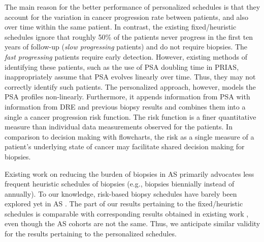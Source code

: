 \documentclass[Afour,sagev,times]{sagej}
\begin{document}
The main reason for the better performance of personalized schedules is that they account for the variation in cancer progression rate between patients, and also over time within the same patient. In contrast, the existing fixed/heuristic schedules ignore that roughly 50\% of the patients never progress in the first ten years of follow-up (\textit{slow progressing} patients) and do not require biopsies. The \textit{fast progressing} patients require early detection. However, existing methods of identifying these patients, such as the use of PSA doubling time in PRIAS, inappropriately assume that PSA evolves linearly over time. Thus, they may not correctly identify such patients. The personalized approach, however, models the PSA profiles non-linearly. Furthermore, it appends information from PSA with information from DRE and previous biopsy results and combines them into a single a cancer progression risk function. The risk function is a finer quantitative measure than individual data measurements observed for the patients. In comparison to decision making with flowcharts, the risk as a single measure of a patient's underlying state of cancer may facilitate shared decision making for biopsies.

Existing work on reducing the burden of biopsies in AS primarily advocates less frequent heuristic schedules of biopsies \citep{inoue2018comparative} (e.g., biopsies biennially instead of annually). To our knowledge, risk-based biopsy schedules have barely been explored yet in AS \cite{nieboer2018active,bruinsma2016active}. The part of our results pertaining to the fixed/heuristic schedules is comparable with corresponding results obtained in existing work \cite{inoue2018comparative}, even though the AS cohorts are not the same. Thus, we anticipate similar validity for the results pertaining to the personalized schedules.
\end{document}
